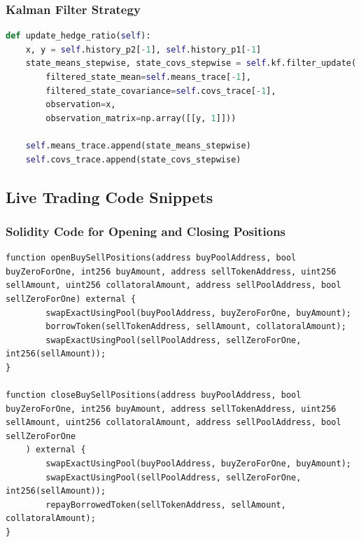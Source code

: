 \subsubsection{Kalman Filter Strategy}
\begin{lstlisting}[language=Python, caption={Calculation of the hedge ratio in \texttt{update\_hedge\_ratio} of the Kalman Filter Strategy},captionpos=b]
def update_hedge_ratio(self):
    x, y = self.history_p2[-1], self.history_p1[-1]
    state_means_stepwise, state_covs_stepwise = self.kf.filter_update(
        filtered_state_mean=self.means_trace[-1],
        filtered_state_covariance=self.covs_trace[-1],
        observation=x,
        observation_matrix=np.array([[y, 1]]))

    self.means_trace.append(state_means_stepwise)
    self.covs_trace.append(state_covs_stepwise)
\end{lstlisting}


\subsection{Live Trading Code Snippets}
\subsubsection{Solidity Code for Opening and Closing Positions \label{fig:sol-code-open-close}}
\begin{lstlisting}[language=Solidity]
function openBuySellPositions(address buyPoolAddress, bool buyZeroForOne, int256 buyAmount, address sellTokenAddress, uint256 sellAmount, uint256 collatoralAmount, address sellPoolAddress, bool sellZeroForOne) external {
        swapExactUsingPool(buyPoolAddress, buyZeroForOne, buyAmount);
        borrowToken(sellTokenAddress, sellAmount, collatoralAmount);
        swapExactUsingPool(sellPoolAddress, sellZeroForOne, int256(sellAmount));
}

function closeBuySellPositions(address buyPoolAddress, bool buyZeroForOne, int256 buyAmount, address sellTokenAddress, uint256 sellAmount, uint256 collatoralAmount, address sellPoolAddress, bool sellZeroForOne
    ) external {
        swapExactUsingPool(buyPoolAddress, buyZeroForOne, buyAmount);
        swapExactUsingPool(sellPoolAddress, sellZeroForOne, int256(sellAmount));
        repayBorrowedToken(sellTokenAddress, sellAmount, collatoralAmount);
}
\end{lstlisting}
